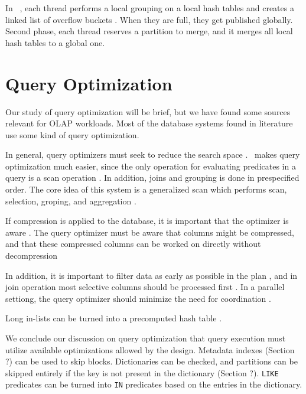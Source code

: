 In \ibm~, each thread performs a local grouping on a local hash tables and creates a linked list of overflow buckets \cite{Raman2013-em}. When they are full, they get published globally. Second phase, each thread reserves a partition to merge, and it merges all local hash tables to a global one.

\section{Query Optimization}
\label{sec:Query Optimization}
Our study of query optimization will be brief, but we have found some sources relevant for OLAP workloads. Most of the database systems found in literature use some kind of query optimization. 

In general, query optimizers must seek to reduce the search space \cite{Boncz2002-yj, Stonebraker2005-qz}. \blink~makes query optimization much easier, since the only operation for evaluating predicates in a query is a scan operation \cite{Barber2012-xt}. In addition, joins and grouping is done in prespecified order. The core idea of this system is a generalized scan which performs scan, selection, groping, and aggregation \cite{Raman2008-gi}. 

If compression is applied to the database, it is important that the optimizer is aware \cite{Westmann200-mz}. The query optimizer must be aware that columns might be compressed, and that these compressed columns can be worked on directly without decompression \cite{Stonebraker2005-qz}

In addition, it is important to filter data as early as possible in the plan \cite{Lamb2012-kg}, and in join operation  most selective columns should be processed first \cite{Holloway2008-rr}. In a parallel settiong, the query optimizer should minimize the need for coordination \cite{Exasol2014-xh}.

Long in-lists can be turned into a precomputed hash table \cite{Raman2013-em}.

We conclude our discussion on query optimization that query execution must utilize available optimizations allowed by the design. Metadata indexes (Section ?) can be used to skip blocks. Dictionaries can be checked, and partitions can be skipped entirely if the key is not present in the dictionary (Section ?). \texttt{LIKE} predicates can be turned into \texttt{IN} predicates based on the entries in the dictionary.


